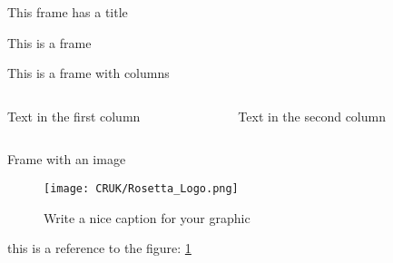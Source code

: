 \begin{frame}{This frame has a title}

This is a frame
\end{frame}

\begin{frame}{This is a frame with columns}
\begin{columns}
\begin{column}{.5\paperwidth}
Text in the first column
\end{column}
\begin{column}{.5\paperwidth}
Text in the second column
\end{column}
\end{columns}
\end{frame}

\begin{frame}{Frame with an image}
\begin{figure}[H]
	\label{figure3}
	\centering
    \texttt{[image: CRUK/Rosetta\_Logo.png]}
    \caption{Write a nice caption for your graphic}
\end{figure}
this is a reference to the figure: \cref{figure3}
\end{frame}